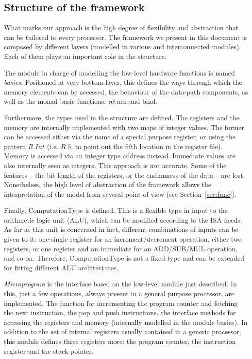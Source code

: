 \documentclass[conference]{IEEEtran}
\begin{document}
\subsection{Structure of the framework}
\label{sec:struct}
What marks our approach is the high degree of flexibility and abstraction that can
be tailored to every processor. The framework we present in this document is composed
by different layers (modelled in various and interconnected modules). Each of them plays 
an important role in the structure.

The module in charge of modelling the low-level hardware functions is named
\textit{basics}. Positioned at very bottom layer, this defines the ways through which the
memory elements can be accessed, the behaviour of the data-path components, 
as well as the monad basic functions: return and bind.

Furthermore, the types used in the structure are defined.
The registers and the memory are internally implemented with two maps of integer values.
The former can be accessed either via the name of a
special purpose register, or using the pattern $R \; Int$ (i.e. $R \; 5$, to point out the
fifth location in the register file). Memory is accessed via an integer type address instead.
Immediate values are also internally seen as integers. This approach is not
accurate. Some of the features -- the bit length of the registers, or the
endianness of the data -- are lost. Nonetheless, the high level of abstraction of
the framework allows the interpretation of the model from several point of view (see
Section~\ref{sec:func}).

Finally, ComputationType is defined. This is a flexible type in input to the
arithmetic logic unit (ALU), which can be modified according to the ISA
needs. As far as this unit is concerned in fact, different combinations of inputs can be
given to it: one single register for an increment/decrement operation, either two 
registers, or one register and an immediate for an ADD/SUB/MUL operation, and so on.
Therefore, ComputationType is not a fixed type and can be extended for fitting different
ALU architectures.

\textit{Microprogram} is the interface based on the low-level module just described.
In this, just a few operations, always present in a general purpose processor, are
implemented. The function for incrementing the program counter and fetching
the next instruction, the pop and push instructions, the interface methods for accessing
the registers and memory (internally modelled in the module basics).
In addition to the set of internal registers usually contained in a generic processor,
this module defines three registers more: the program counter, the instruction register and
the stack pointer.
\end{document}
